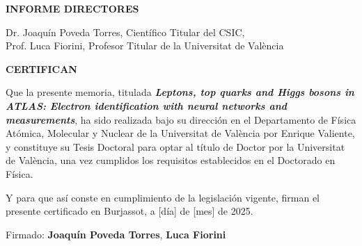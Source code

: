 \thispagestyle{empty}

\begin{center}
  \vspace*{\fill}

  {\bfseries\LARGE INFORME DIRECTORES}\par
  \vspace{0.8cm}

  \noindent
  Dr. Joaquín Poveda Torres, Científico Titular del CSIC,\\
  Prof. Luca Fiorini, Profesor Titular de la Universitat de València
\end{center}
  \vspace{0.8cm}


  \begin{center}
  {\bfseries\Large CERTIFICAN}\par
  \vspace{0.8cm}
  \end{center}

  Que la presente memoria, titulada \textbf{\textit{Leptons, top quarks and Higgs bosons in ATLAS: Electron identification with neural networks and \ttH measurements}},
  ha sido realizada bajo su dirección en el Departamento de Física Atómica, Molecular y Nuclear de la Universitat de València por Enrique Valiente, 
  y constituye su Tesis Doctoral para optar al título de Doctor por la Universitat de València, una vez cumplidos los requisitos establecidos en el Doctorado en Física.  
  
  \vspace{0.7cm}
  
  Y para que así conste en cumplimiento de la legislación vigente, firman el presente certificado en Burjassot, a [día] de [mes] de 2025.  
  
  \vspace{2cm}
  
  \begin{flushright}
  \hfill Firmado: \textbf{Joaquín Poveda Torres},  \textbf{Luca Fiorini}
  \end{flushright}
  \vspace*{\fill}

